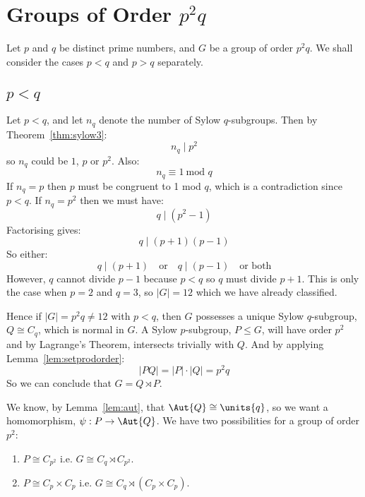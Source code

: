 \section{Groups of Order \(p^2q\)}
Let \(p\) and \(q\) be distinct prime numbers, and \(G\) be a group of order \(p^2q\).
We shall consider the cases \(p < q\) and \(p > q\) separately.

\subsection{\(p < q\)}
Let \(p < q\), and let \(n_q\) denote the number of Sylow \(q\)-subgroups.
Then by Theorem~\ref{thm:sylow3}:
\[n_q \mid p^2\]
so \(n_q\) could be \(1\), \(p\) or \(p^2\).
Also:
\[n_q \equiv 1 \ \text{mod \(q\)}\]
If \(n_q  = p\) then \(p\) must be congruent to 1 mod \(q\), which is a contradiction since \(p < q\).
If \(n_q = p^2\) then we must have:
\[q \mid (p^2 - 1)\]
Factorising gives:
\[q \mid (p+1)(p-1)\]
So either:
\[q \mid (p+1) \quad \text{or} \quad q \mid (p-1) \quad \text{or both}\]
However, \(q\) cannot divide \(p-1\) because \(p < q\) so \(q\) must divide \(p+1\).
This is only the case when \(p = 2\) and \(q = 3\), so \(|G| = 12\) which we have already classified.

Hence if \(|G| = p^2 q \neq 12\) with \(p < q\), then \(G\) possesses a unique Sylow \(q\)-subgroup, \(Q \cong C_q\), which is
normal in \(G\).
A Sylow \(p\)-subgroup, \(P \leqslant G\), will have order \(p^2\) and by Lagrange's Theorem, intersects trivially with
\(Q\).
And by applying Lemma~\ref{lem:setprodorder}:
\[|PQ| = |P| \cdot |Q| = p^2 q\]
So we can conclude that \(G  = Q \rtimes P\).

We know, by Lemma~\ref{lem:aut}, that \(\Aut{Q} \cong \units{q}\), so we want a homomorphism, \(\psi:P \to \Aut{Q}\).
We have two possibilities for a group of order \(p^2\):

\begin{enumerate}
    \item \(P \cong C_{p^2}\) i.e. \(G \cong C_q \rtimes C_{p^2}\).
    \item \(P \cong C_p \times C_p\) i.e. \(G \cong C_q \rtimes (C_p \times C_p)\).
\end{enumerate}

